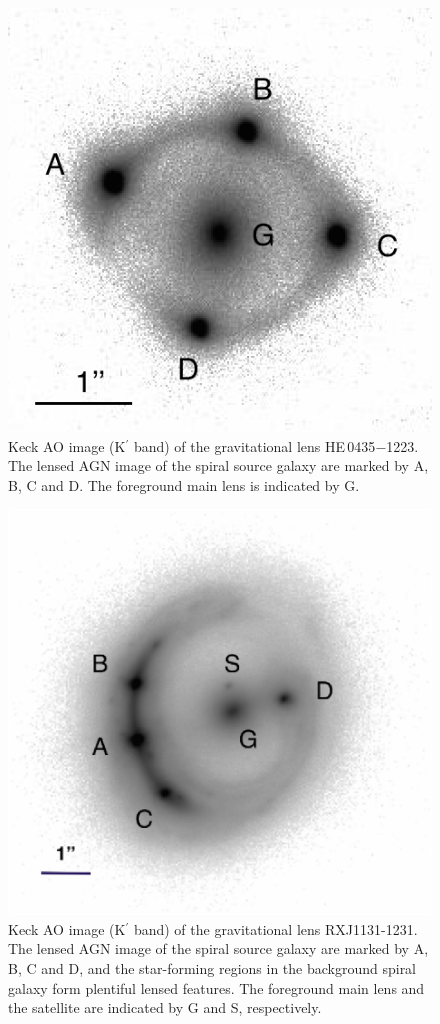 \documentclass[useAMS,usenatbib]{mnras}
\newcommand\he{HE\,0435$-$1223}
\begin{document}
\begin{figure}
\includegraphics*[scale=1]{HE0435-1231.png}
\caption{Keck AO image (K$^\prime$ band) of the gravitational lens \he. The lensed AGN image of the spiral source galaxy are marked by A, B, C and D. The foreground main lens is indicated by G.}
\label{fig:HE0435image}
\end{figure}

\begin{figure}
\includegraphics*[scale=0.56]{RXJ1131_image3.eps}
\caption{Keck AO image (K$^\prime$ band) of the gravitational lens RXJ1131-1231. The lensed AGN image  of the spiral source galaxy are marked by A, B, C and D, and the star-forming regions in the background spiral galaxy form plentiful lensed features. The foreground main lens and the satellite are indicated by G and S, respectively.}
\label{fig:RXJ1131image}
\end{figure}
\end{document}
